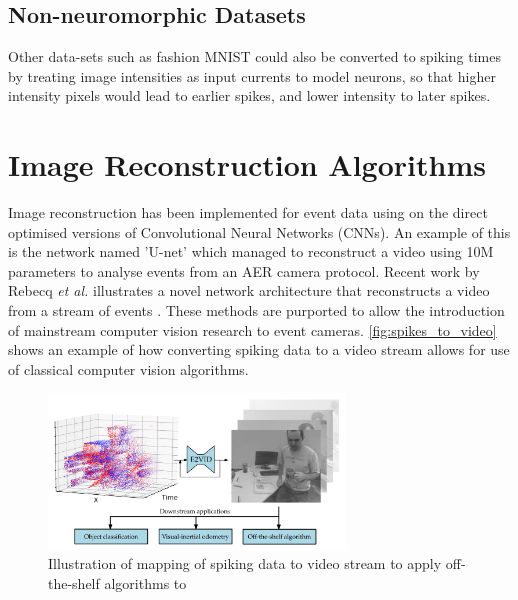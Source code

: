 \subsection{Non-neuromorphic Datasets}

Other data-sets such as fashion MNIST could also be converted to spiking times by treating image intensities as input currents to model neurons, so that higher intensity pixels would lead to earlier spikes, and lower intensity to later spikes.

\section{Image Reconstruction Algorithms}

Image reconstruction has been implemented for event data using on the direct optimised versions of Convolutional Neural Networks (CNNs). An example of this is the network named 'U-net'\cite{UNET} which managed to reconstruct a video using 10M parameters to analyse events from an AER camera protocol. Recent work by Rebecq \textit{et al.} illustrates a novel network architecture that reconstructs a video from a stream of events \cite{spikingToVideo}. These methods are purported to allow the introduction of mainstream computer vision research to event cameras. \autoref{fig:spikes_to_video} shows an example of how converting spiking data to a video stream allows for use of classical computer vision algorithms.

\begin{figure}[htb]
      \centering
      \includegraphics[width=0.7\textwidth]{background/images/spikes_to_video.png}
      \caption{Illustration of mapping of spiking data to video stream to apply off-the-shelf algorithms to\cite{spikingToVideo}}
      \label{fig:spikes_to_video}
\end{figure}


